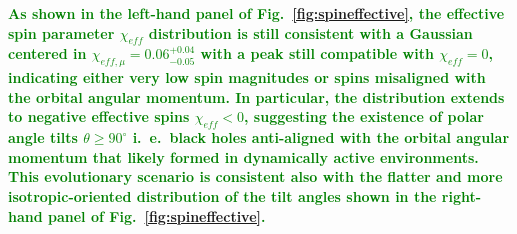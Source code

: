 \documentclass[a4paper,titlepage]{book}     	%
\newcommand{\erika}[1]{\textcolor{green}{\bf#1}}
\begin{document}
\erika{As shown in the left-hand panel of Fig.\ \ref{fig:spineffective}, the effective spin parameter $\chi_{eff}$ distribution is still consistent with a Gaussian centered in $\chi_{eff, \mu} = 0.06_{-0.05}^{+0.04}$ with a peak still compatible with $\chi_{eff} = 0$, indicating either very low spin magnitudes or spins misaligned with the orbital angular momentum. In particular, the distribution extends to negative effective spins $\chi_{eff} < 0$, suggesting the existence of polar angle tilts $\theta \geq 90^\circ $ i.\ e.\ black holes anti-aligned with the orbital angular momentum that likely formed in dynamically active environments. This evolutionary scenario is consistent also with the flatter and more isotropic-oriented distribution of the tilt angles shown in the right-hand panel of Fig.\ \ref{fig:spineffective}. }
\end{document}
